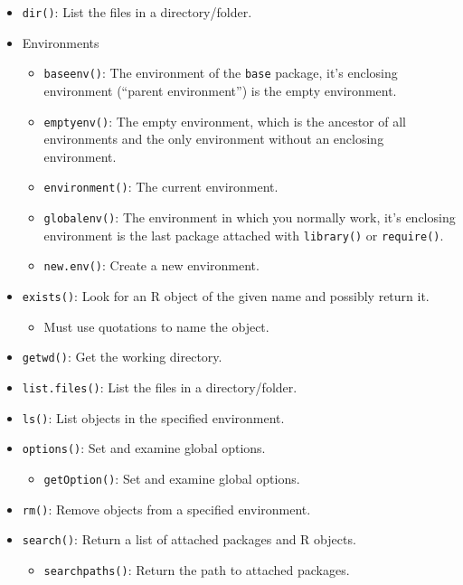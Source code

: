\documentclass[]{book}
\providecommand{\tightlist}{%
  \setlength{\itemsep}{0pt}\setlength{\parskip}{0pt}}
\theoremstyle{definition}
\theoremstyle{definition}
\theoremstyle{definition}
\theoremstyle{remark}
\begin{document}
\begin{itemize}
\tightlist
\item
  \texttt{dir()}: List the files in a directory/folder.
\item
  Environments

  \begin{itemize}
  \tightlist
  \item
    \texttt{baseenv()}: The environment of the \texttt{base} package,
    it's enclosing environment (``parent environment'') is the empty
    environment.
  \item
    \texttt{emptyenv()}: The empty environment, which is the ancestor of
    all environments and the only environment without an enclosing
    environment.
  \item
    \texttt{environment()}: The current environment.
  \item
    \texttt{globalenv()}: The environment in which you normally work,
    it's enclosing environment is the last package attached with
    \texttt{library()} or \texttt{require()}.
  \item
    \texttt{new.env()}: Create a new environment.
  \end{itemize}
\item
  \texttt{exists()}: Look for an R object of the given name and possibly
  return it.

  \begin{itemize}
  \tightlist
  \item
    Must use quotations to name the object.
  \end{itemize}
\item
  \texttt{getwd()}: Get the working directory.\\
\item
  \texttt{list.files()}: List the files in a directory/folder.
\item
  \texttt{ls()}: List objects in the specified environment.
\item
  \texttt{options()}: Set and examine global options.

  \begin{itemize}
  \tightlist
  \item
    \texttt{getOption()}: Set and examine global options.
  \end{itemize}
\item
  \texttt{rm()}: Remove objects from a specified environment.
\item
  \texttt{search()}: Return a list of attached packages and R objects.

  \begin{itemize}
  \tightlist
  \item
    \texttt{searchpaths()}: Return the path to attached packages.
  \end{itemize}
\end{itemize}
\end{document}
